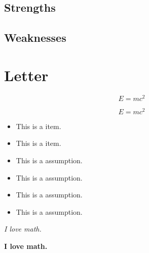 \documentclass{mcmthesis}  %
\begin{document}
\subsection{Strengths}
\subsection{Weaknesses}

\section{Letter}



\begin{equation}  %
E = mc^2 \label{aa}  %
\end{equation}  %

\begin{equation}  %
\nonumber %
E = mc^2
\end{equation}  %


\begin{itemize}  %
        \item This is a item.
        \item This is a item.
\end{itemize}  %


\begin{itemize}  %
                \item This is a assumption.
                \item This is a assumption.
                \item This is a assumption.
                \item This is a assumption.
 \end{itemize}  %

 \textit{I love math.}  %

\textbf{I love math.}  %
\end{document}
